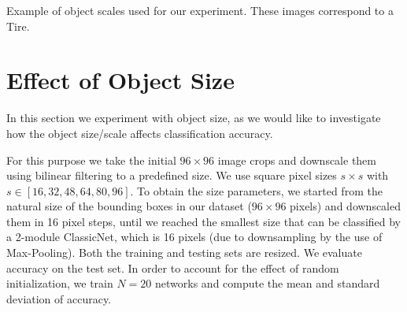 \begin{marginfigure}
	\centering

	\vspace{5pt}
	
	
	\vspace{5pt}
	
	
	\vspace{5pt}
	
	
	\vspace{5pt}
	
	
	\vspace{5pt}
	
	
	\caption[Example of object scales used for our experiment]{Example of object scales used for our experiment. These images correspond to a Tire.}
\end{marginfigure}

\FloatBarrier
\section{Effect of Object Size}

In this section we experiment with object size, as we would like to investigate how the object size/scale affects classification accuracy.

For this purpose we take the initial $96 \times 96$ image crops and downscale them using bilinear filtering to a predefined size. We use square pixel sizes $s \times s$ with $s \in [16, 32, 48, 64, 80, 96]$. To obtain the size parameters, we started from the natural size of the bounding boxes in our dataset ($96 \times 96$ pixels) and downscaled them in 16 pixel steps, until we reached the smallest size that can be classified by a 2-module ClassicNet, which is 16 pixels (due to downsampling by the use of Max-Pooling). Both the training and testing sets are resized. We evaluate accuracy on the test set. In order to account for the effect of random initialization, we train $N = 20$ networks and compute the mean and standard deviation of accuracy.

